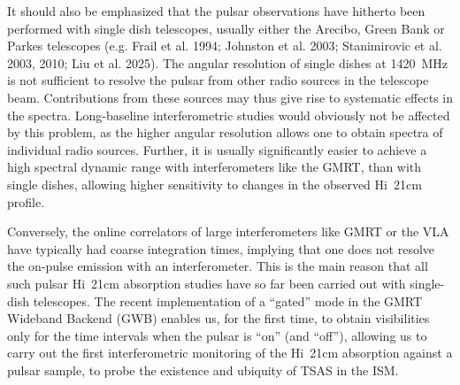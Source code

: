 \documentclass[11pt]{article}
\newcommand{\hi}{H{\sc i}}
\begin{document}
It should also be emphasized that the pulsar observations have hitherto been performed with single dish telescopes, usually either the Arecibo, Green Bank or Parkes telescopes (e.g. Frail et al. 1994; Johnston et al. 2003; Stanimirovic et al. 2003, 2010; Liu et al. 2025). The angular resolution of single dishes at 1420~MHz is not sufficient to resolve the  pulsar from other radio sources in the telescope beam. Contributions from these sources may thus give rise to  systematic effects in the spectra. Long-baseline  interferometric studies would obviously not be affected by this problem, as the higher angular resolution allows one to obtain spectra of individual radio sources. Further, it is usually significantly easier to achieve a high spectral dynamic range with interferometers like the GMRT, than with single dishes, allowing higher sensitivity to changes in the observed \hi~21cm profile. 


Conversely, the online correlators of large interferometers like GMRT or the VLA have typically had coarse integration times, implying that one does not resolve the on-pulse emission with an interferometer. This is the main reason that all such pulsar \hi~21cm absorption studies have so far been carried out with single-dish telescopes. The recent implementation of a ``gated'' mode in the GMRT Wideband Backend (GWB) enables us, for the first time, to obtain visibilities only for the time intervals when the pulsar is ``on'' (and ``off''), allowing us to carry out the first interferometric monitoring of the \hi~21cm absorption against a pulsar sample, to probe the existence and ubiquity of TSAS in the ISM. 






\vskip 0.15in
\vskip 0.1in 
\end{document}
